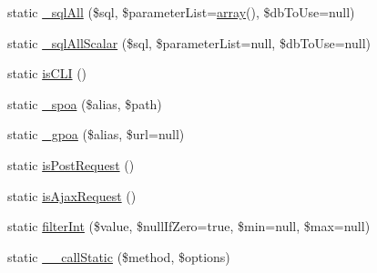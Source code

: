 \begin{DoxyCompactItemize}
\item 
static \hyperlink{classCPSHelperBase_a0e881421b99ec642662a4512c8ea5f0f}{\_\-sqlAll} (\$sql, \$parameterList=\hyperlink{list_8php_aa3205d038c7f8feb5c9f01ac4dfadc88}{array}(), \$dbToUse=null)
\item 
static \hyperlink{classCPSHelperBase_a5a5366761d080ff8519cc21617ecdbe1}{\_\-sqlAllScalar} (\$sql, \$parameterList=null, \$dbToUse=null)
\item 
static \hyperlink{classCPSHelperBase_a30e8d8207d35adf28c3847fa4b6cc86a}{isCLI} ()
\item 
static \hyperlink{classCPSHelperBase_ab02e1c46b44a987b618518eb50dbfa59}{\_\-spoa} (\$alias, \$path)
\item 
static \hyperlink{classCPSHelperBase_a3447bf2ade7892df7faaaf37b5068bc8}{\_\-gpoa} (\$alias, \$url=null)
\item 
static \hyperlink{classCPSHelperBase_a58562fcc2fc0a157f361c6eae58b641c}{isPostRequest} ()
\item 
static \hyperlink{classCPSHelperBase_ad29992b5c09cbad51dc5978f09903b28}{isAjaxRequest} ()
\item 
static \hyperlink{classCPSHelperBase_af85a0a7c257706608cc74ce7074c1ea6}{filterInt} (\$value, \$nullIfZero=true, \$min=null, \$max=null)
\item 
static \hyperlink{classCPSHelperBase_a59132e5a5d4617a63c98a5509a2b7596}{\_\-\_\-callStatic} (\$method, \$options)
\end{DoxyCompactItemize}
